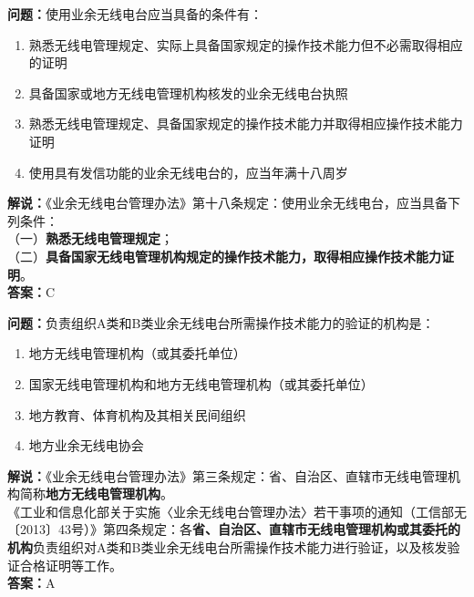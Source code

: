 \bigskip


\noindent\textbf{问题：}使用业余无线电台应当具备的条件有：
\begin{enumerate}[label=\Alph*), leftmargin=3em]
	\item 熟悉无线电管理规定、实际上具备国家规定的操作技术能力但不必需取得相应的证明
	\item 具备国家或地方无线电管理机构核发的业余无线电台执照
	\item 熟悉无线电管理规定、具备国家规定的操作技术能力并取得相应操作技术能力证明
	\item 使用具有发信功能的业余无线电台的，应当年满十八周岁
\end{enumerate}
\noindent\textbf{解说：}《业余无线电台管理办法》第十八条规定：使用业余无线电台，应当具备下列条件：\\
（一）\textbf{熟悉无线电管理规定}；\\
（二）\textbf{具备国家无线电管理机构规定的操作技术能力，取得相应操作技术能力证明}。\\\noindent\textbf{答案：}C



\bigskip


\noindent\textbf{问题：}负责组织A类和B类业余无线电台所需操作技术能力的验证的机构是：
\begin{enumerate}[label=\Alph*), leftmargin=3em]
	\item 地方无线电管理机构（或其委托单位）
	\item 国家无线电管理机构和地方无线电管理机构（或其委托单位）
	\item 地方教育、体育机构及其相关民间组织
	\item 地方业余无线电协会
\end{enumerate}
\noindent\textbf{解说：}《业余无线电台管理办法》第三条规定：省、自治区、直辖市无线电管理机构简称\textbf{地方无线电管理机构}。\\
《工业和信息化部关于实施〈业余无线电台管理办法〉若干事项的通知（工信部无〔2013〕43号）》第四条规定：各\textbf{省、自治区、直辖市无线电管理机构或其委托的机构}负责组织对A类和B类业余无线电台所需操作技术能力进行验证，以及核发验证合格证明等工作。\\\noindent\textbf{答案：}A



\bigskip


